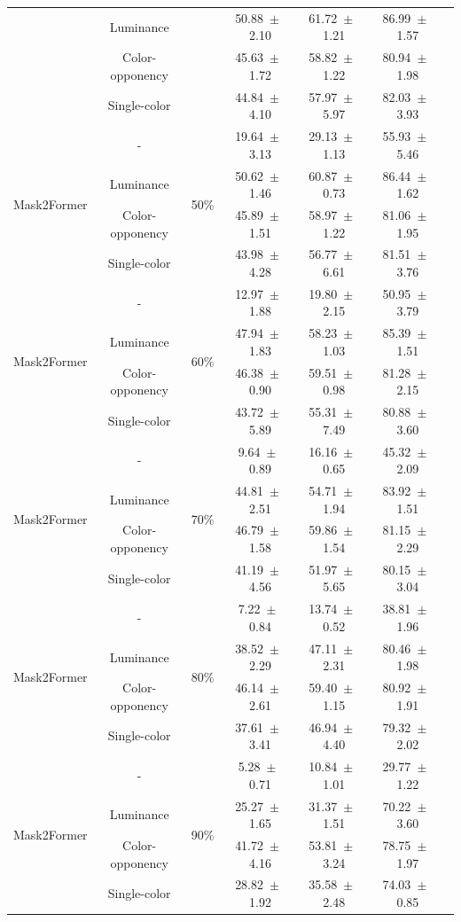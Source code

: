 \begin{table}[h]
\begin{tabular}{@{}lccc ccc@{}}
& Luminance & & 50.88~$\pm$~2.10 & 61.72~$\pm$~1.21 & 86.99~$\pm$~1.57 \\
& Color-opponency & & 45.63~$\pm$~1.72 & 58.82~$\pm$~1.22 & 80.94~$\pm$~1.98 \\
& Single-color & & 44.84~$\pm$~4.10 & 57.97~$\pm$~5.97 & 82.03~$\pm$~3.93 \\
\midrule
\multirow{4}{*}{Mask2Former} & - & \multirow{4}{*}{50\%} & 19.64~$\pm$~3.13 & 29.13~$\pm$~1.13 & 55.93~$\pm$~5.46 \\
& Luminance & & 50.62~$\pm$~1.46 & 60.87~$\pm$~0.73 & 86.44~$\pm$~1.62 \\
& Color-opponency & & 45.89~$\pm$~1.51 & 58.97~$\pm$~1.22 & 81.06~$\pm$~1.95 \\
& Single-color & & 43.98~$\pm$~4.28 & 56.77~$\pm$~6.61 & 81.51~$\pm$~3.76 \\
\midrule
\multirow{4}{*}{Mask2Former} & - & \multirow{4}{*}{60\%} & 12.97~$\pm$~1.88 & 19.80~$\pm$~2.15 & 50.95~$\pm$~3.79 \\
& Luminance & & 47.94~$\pm$~1.83 & 58.23~$\pm$~1.03 & 85.39~$\pm$~1.51 \\
& Color-opponency & & 46.38~$\pm$~0.90 & 59.51~$\pm$~0.98 & 81.28~$\pm$~2.15 \\
& Single-color & & 43.72~$\pm$~5.89 & 55.31~$\pm$~7.49 & 80.88~$\pm$~3.60 \\
\midrule
\multirow{4}{*}{Mask2Former} & - & \multirow{4}{*}{70\%} & 9.64~$\pm$~0.89 & 16.16~$\pm$~0.65 & 45.32~$\pm$~2.09 \\
& Luminance & & 44.81~$\pm$~2.51 & 54.71~$\pm$~1.94 & 83.92~$\pm$~1.51 \\
& Color-opponency & & 46.79~$\pm$~1.58 & 59.86~$\pm$~1.54 & 81.15~$\pm$~2.29 \\
& Single-color & & 41.19~$\pm$~4.56 & 51.97~$\pm$~5.65 & 80.15~$\pm$~3.04 \\
\midrule
\multirow{4}{*}{Mask2Former} & - & \multirow{4}{*}{80\%} & 7.22~$\pm$~0.84 & 13.74~$\pm$~0.52 & 38.81~$\pm$~1.96 \\
& Luminance & & 38.52~$\pm$~2.29 & 47.11~$\pm$~2.31 & 80.46~$\pm$~1.98 \\
& Color-opponency & & 46.14~$\pm$~2.61 & 59.40~$\pm$~1.15 & 80.92~$\pm$~1.91 \\
& Single-color & & 37.61~$\pm$~3.41 & 46.94~$\pm$~4.40 & 79.32~$\pm$~2.02 \\
\midrule
\multirow{4}{*}{Mask2Former} & - & \multirow{4}{*}{90\%} & 5.28~$\pm$~0.71 & 10.84~$\pm$~1.01 & 29.77~$\pm$~1.22 \\
& Luminance & & 25.27~$\pm$~1.65 & 31.37~$\pm$~1.51 & 70.22~$\pm$~3.60 \\
& Color-opponency & & 41.72~$\pm$~4.16 & 53.81~$\pm$~3.24 & 78.75~$\pm$~1.97 \\
& Single-color & & 28.82~$\pm$~1.92 & 35.58~$\pm$~2.48 & 74.03~$\pm$~0.85 \\
\midrule
\bottomrule
\end{tabular}
\label{tab:sparse_results_mask2former_acdc_snow}
\end{table}